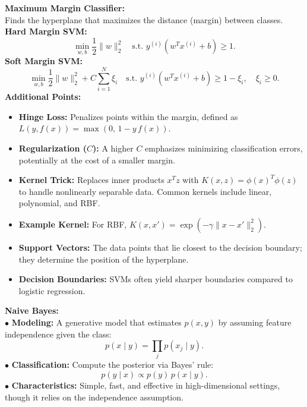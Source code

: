 \documentclass[10pt,landscape]{article}
\begin{document}
\begin{multicols}{3}
\begin{tcolorbox}[breakable, title=Support Vector Machines (SVMs)]
\textbf{Maximum Margin Classifier:}\\
Finds the hyperplane that maximizes the distance (margin) between classes.\\[1mm]
\textbf{Hard Margin SVM:}\\
\[
\min_{w,b} \frac{1}{2}\|w\|_2^2 \quad \text{s.t. } y^{(i)}(w^T x^{(i)}+b) \ge 1.
\]
\textbf{Soft Margin SVM:}\\
\[
\min_{w,b} \frac{1}{2}\|w\|_2^2 + C\sum_{i=1}^N \xi_i \quad \text{s.t. } y^{(i)}(w^T x^{(i)}+b) \ge 1-\xi_i,\quad \xi_i\ge0.
\]
\textbf{Additional Points:}
\begin{itemize}[noitemsep, topsep=0pt]
    \item \textbf{Hinge Loss:} Penalizes points within the margin, defined as \(L(y, f(x))=\max(0,\,1-y\,f(x))\).
    \item \textbf{Regularization (\(C\)):} A higher \(C\) emphasizes minimizing classification errors, potentially at the cost of a smaller margin.
    \item \textbf{Kernel Trick:} Replaces inner products \(x^Tz\) with \(K(x,z)=\phi(x)^T\phi(z)\) to handle nonlinearly separable data. Common kernels include linear, polynomial, and RBF.
    \item \textbf{Example Kernel:} For RBF, \(K(x,x')=\exp(-\gamma\|x-x'\|_2^2)\).
    \item \textbf{Support Vectors:} The data points that lie closest to the decision boundary; they determine the position of the hyperplane.
    \item \textbf{Decision Boundaries:} SVMs often yield sharper boundaries compared to logistic regression.
\end{itemize}
\end{tcolorbox}

\begin{tcolorbox}[breakable, title=Naive Bayes \& Bayesian Linear Regression]
\textbf{Naive Bayes:}\\[1mm]
\(\bullet\) \textbf{Modeling:} A generative model that estimates \(p(x,y)\) by assuming feature independence given the class:
\[
p(x\mid y) = \prod_{j} p(x_j \mid y).
\]
\(\bullet\) \textbf{Classification:} Compute the posterior via Bayes' rule:
\[
p(y\mid x) \propto p(y)\,p(x\mid y).
\]
\(\bullet\) \textbf{Characteristics:} Simple, fast, and effective in high-dimensional settings, though it relies on the independence assumption.


\end{tcolorbox}
\end{multicols}
\end{document}
